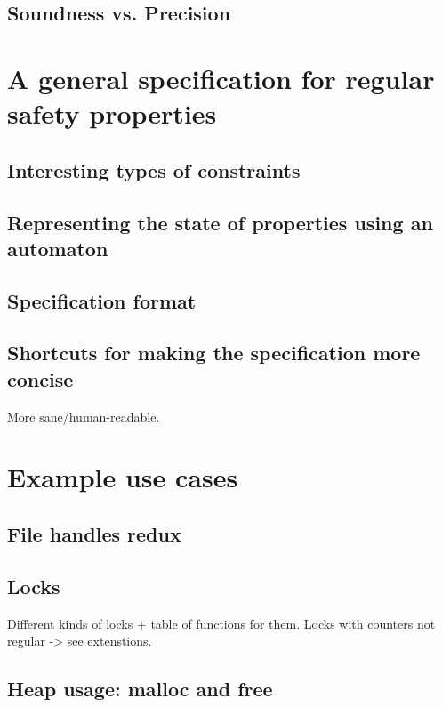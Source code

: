 \section{Soundness vs. Precision}


\chapter{A general specification for regular safety properties}
\section{Interesting types of constraints}

\section{Representing the state of properties using an automaton}

\section{Specification format}

\section{Shortcuts for making the specification more concise}
More sane/human-readable.


\chapter{Example use cases}

\section{File handles redux}

\section{Locks}
Different kinds of locks + table of functions for them.
Locks with counters not regular -> see extenstions.

\section{Heap usage: malloc and free}


